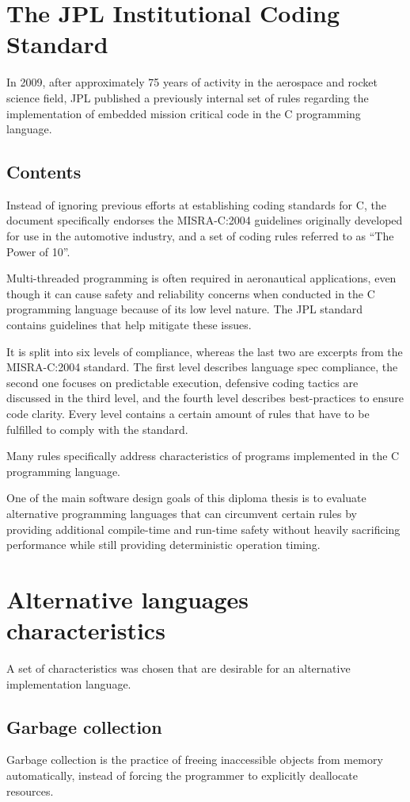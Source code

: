 \section{The JPL Institutional Coding Standard}
In 2009, after approximately 75 years of activity in the aerospace and rocket science field, JPL published a previously internal set of rules regarding the implementation of embedded mission critical code in the C programming language. 

\subsection{Contents}
Instead of ignoring previous efforts at establishing coding standards for C, the document specifically endorses the MISRA-C:2004 guidelines originally developed for use in the automotive industry, and a set of coding rules referred to as “The Power of 10”. 

Multi-threaded programming is often required in aeronautical applications, even though it can cause safety and reliability concerns when conducted in the C programming language because of its low level nature. The JPL standard contains guidelines that help mitigate these issues.

It is split into six levels of compliance, whereas the last two are excerpts from the MISRA-C:2004 standard. The first level describes language spec compliance, the second one focuses on predictable execution, defensive coding tactics are discussed in the third level, and the fourth level describes best-practices to ensure code clarity. Every level contains a certain amount of rules that have to be fulfilled to comply with the standard.

Many rules specifically address characteristics of programs implemented in the C programming language.

One of the main software design goals of this diploma thesis is to evaluate alternative programming languages that can circumvent certain rules by providing additional compile-time and run-time safety without heavily sacrificing performance while still providing deterministic operation timing.

\section{Alternative languages characteristics}
A set of characteristics was chosen that are desirable for an alternative implementation language. 

\subsection{Garbage collection}
Garbage collection is the practice of freeing inaccessible objects from memory automatically, instead of forcing the programmer to explicitly deallocate resources.

